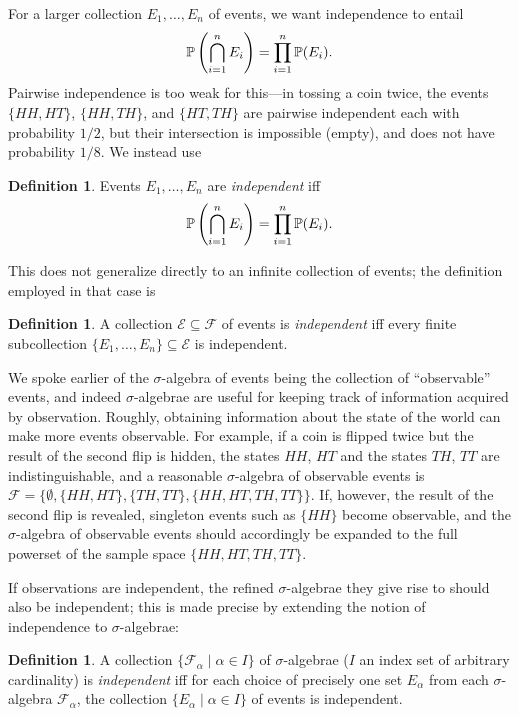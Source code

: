 \documentclass[leqno]{article}
\theoremstyle{definition}
\newtheorem{definition}[theorem]{Definition}
\newcommand{\bldset}[2]{\{{#1}\mid{#2}\}}
\begin{document}
For a larger collection $E_1, \ldots, E_n$ of events, we want independence to entail
\[ \P\left(\bigcap_{i=1}^n E_i\right) = \prod_{i=1}^n \P(E_i). \]
Pairwise independence is too weak for this---in tossing a coin twice, the events $\{HH,HT\}$, $\{HH,TH\}$, and $\{HT,TH\}$ are pairwise independent each with probability $1/2$, but their intersection is impossible (empty), and does not have probability $1/8$. We instead use

\begin{definition}
Events $E_1, \ldots, E_n$ are {\em independent} iff
\[ \P\left(\bigcap_{i=1}^n E_i\right) = \prod_{i=1}^n \P(E_i). \]
\end{definition}

This does not generalize directly to an infinite collection of events; the definition employed in that case is

\begin{definition}
A collection $\mathcal E \subseteq \mathcal F$ of events is {\em independent} iff every finite subcollection $\{E_1, \ldots, E_n\} \subseteq \mathcal E$ is independent.
\end{definition}

We spoke earlier of the $\sigma$-algebra of events being the collection of ``observable'' events, and indeed $\sigma$-algebrae are useful for keeping track of information acquired by observation. Roughly, obtaining information about the state of the world can make more events observable. For example, if a coin is flipped twice but the result of the second flip is hidden, the states $HH$, $HT$ and the states $TH$, $TT$ are indistinguishable, and a reasonable $\sigma$-algebra of observable events is $\mathcal F = \{\emptyset, \{HH, HT\},\{TH, TT\}, \{HH, HT, TH, TT\}\}$. If, however, the result of the second flip is revealed, singleton events such as $\{HH\}$ become observable, and the $\sigma$-algebra of observable events should accordingly be expanded to the full powerset of the sample space $\{HH, HT, TH, TT\}$.

If observations are independent, the refined $\sigma$-algebrae they give rise to should also be independent; this is made precise by extending the notion of independence to $\sigma$-algebrae:

\begin{definition}
A collection $\bldset{\mathcal F_\alpha}{\alpha \in I}$ of $\sigma$-algebrae ($I$ an index set of arbitrary cardinality) is {\em independent} iff for each choice of precisely one set $E_\alpha$ from each $\sigma$-algebra $\mathcal F_\alpha$, the collection $\bldset{E_\alpha}{\alpha \in I}$ of events is independent.
\end{definition}
\end{document}
